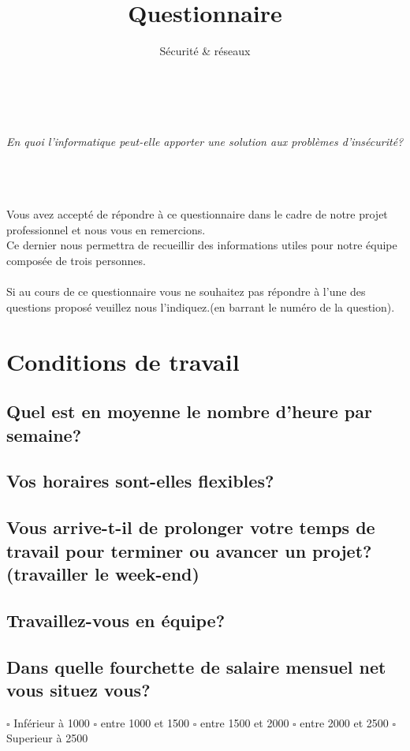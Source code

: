 \documentclass{article}
\title{Questionnaire}
\date{Sécurité \& réseaux}
\newcommand{\Pointilles}[1][3]
{
	\multido{}{#1}{\makebox[\linewidth]{\dotfill}\\[\parskip]}
}
\begin{document}
	\maketitle 
	\begin{center}
	\LARGE{\textit{\\\ \\En quoi l'informatique peut-elle apporter une solution aux problèmes d'insécurité?\\\ \\\ \\\ \\}}
	\end{center}
	Vous avez accepté de répondre à ce questionnaire dans le cadre de notre projet professionnel et nous vous en remercions.\\
	Ce dernier nous permettra de recueillir des informations utiles pour notre équipe composée de trois personnes. \\\\
	Si au cours de ce questionnaire vous ne souhaitez pas répondre à l'une des questions proposé veuillez nous l'indiquez.(en barrant le numéro de la question).
	\newpage
	\section{Conditions de travail}
		\subsection{Quel est en moyenne le nombre d'heure par semaine?}
			\noindent\Pointilles[4]
		\subsection{Vos horaires sont-elles flexibles?}
			\noindent\Pointilles[9]
		\subsection{Vous arrive-t-il de prolonger votre temps de travail pour terminer ou avancer un projet? (travailler le week-end)}
			\noindent\Pointilles[9]
		\subsection{Travaillez-vous en équipe?}
			\noindent\Pointilles[7]
		\subsection{Dans quelle fourchette de salaire mensuel net vous situez vous?}
			\noindent
			$\square$ Inférieur à 1000 $\square$ entre 1000 et 1500 $\square$ entre 1500 et 2000 $\square$ entre 2000 et 2500 $\square$ Superieur à 2500
\end{document}

